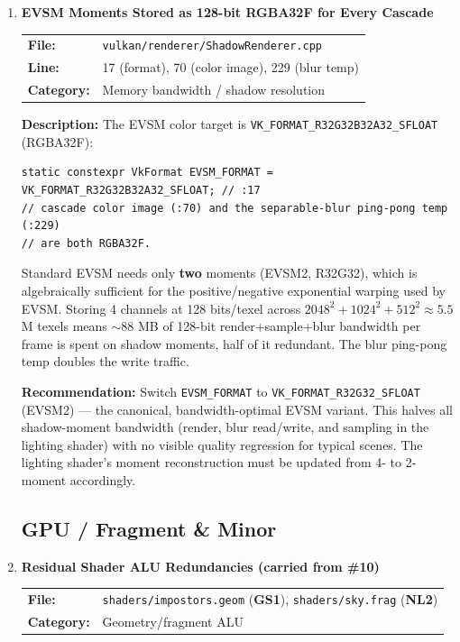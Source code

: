 \documentclass[a4paper,12pt]{article}
\newcommand{\severitybox}[2]{%
  \colorbox{#1}{\makebox[2.5cm][c]{\textcolor{white}{\textbf{#2}}}}%
}
\begin{document}
\begin{enumerate}[leftmargin=*]
\item[\textbf{[N3]}] \textbf{EVSM Moments Stored as 128-bit RGBA32F for Every Cascade}
  \hfill \severitybox{mediumcolor}{MEDIUM}

  \begin{tabular}{ll}
    \textbf{File:} & \texttt{vulkan/renderer/ShadowRenderer.cpp} \\
    \textbf{Line:} & 17 (format), 70 (color image), 229 (blur temp) \\
    \textbf{Category:} & Memory bandwidth / shadow resolution \\
  \end{tabular}

  \textbf{Description:}
  The EVSM color target is \texttt{VK\_FORMAT\_R32G32B32A32\_SFLOAT}
  (RGBA32F):

\begin{lstlisting}
static constexpr VkFormat EVSM_FORMAT = VK_FORMAT_R32G32B32A32_SFLOAT; // :17
// cascade color image (:70) and the separable-blur ping-pong temp (:229)
// are both RGBA32F.
\end{lstlisting}

  Standard EVSM needs only \textbf{two} moments (EVSM2, R32G32), which is
  algebraically sufficient for the positive/negative exponential warping used by
  EVSM. Storing 4 channels at 128 bits/texel across
  $2048^2 + 1024^2 + 512^2 \approx 5.5$ M texels means $\sim$88 MB of 128-bit
  render+sample+blur bandwidth per frame is spent on shadow moments, half of it
  redundant. The blur ping-pong temp doubles the write traffic.

  \textbf{Recommendation:}
  Switch \texttt{EVSM\_FORMAT} to \texttt{VK\_FORMAT\_R32G32\_SFLOAT}
  (EVSM2) — the canonical, bandwidth-optimal EVSM variant. This halves all
  shadow-moment bandwidth (render, blur read/write, and sampling in the lighting
  shader) with no visible quality regression for typical scenes. The lighting
  shader's moment reconstruction must be updated from 4- to 2-moment accordingly.

\subsection{GPU / Fragment \& Minor}

\item[\textbf{[N4]}] \textbf{Residual Shader ALU Redundancies (carried from \#10)}
  \hfill \severitybox{mediumcolor}{MEDIUM}

  \begin{tabular}{ll}
    \textbf{File:} & \texttt{shaders/impostors.geom} (\textbf{GS1}), \texttt{shaders/sky.frag} (\textbf{NL2}) \\
    \textbf{Category:} & Geometry/fragment ALU \\
  \end{tabular}


\end{enumerate}
\end{document}
